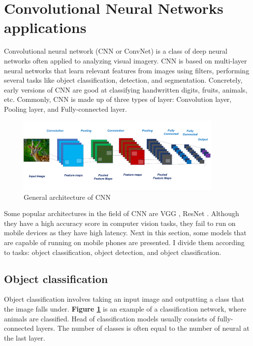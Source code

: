 \section{Convolutional Neural Networks applications} \label{sec:cnn}

Convolutional neural network (CNN or ConvNet) is a class of deep neural networks often applied to analyzing visual imagery. CNN is based on multi-layer neural networks that learn relevant features from images using filters, performing several tasks like object classification, detection, and segmentation. Concretely, early versions of CNN are good at classifying handwritten digits, fruits, animals, etc. Commonly, CNN is made up of three types of layer: Convolution layer, Pooling layer, and Fully-connected layer. 

\begin{figure} [H]
    \centering
    \includegraphics[width=0.9\textwidth]{chapter2/image/CNN.png}
    \caption{General architecture of CNN}
    \label{fig:cnn}
\end{figure}

Some popular architectures in the field of CNN are VGG \cite{vgg}, ResNet \cite{resnet}. Although they have a high accuracy score in computer vision tasks, they fail to run on mobile devices as they have high latency. Next in this section, some models that are capable of running on mobile phones are presented. I divide them according to tasks: object classification, object detection, and object classification.

\subsection{Object classification}
Object classification involves taking an input image and outputting a class that the image falls under. \textbf{Figure \ref{fig:cnn}} is an example of a classification network, where animals are classified. Head of classification models usually consists of fully-connected layers. The number of classes is often equal to the number of neural at the last layer. \par

